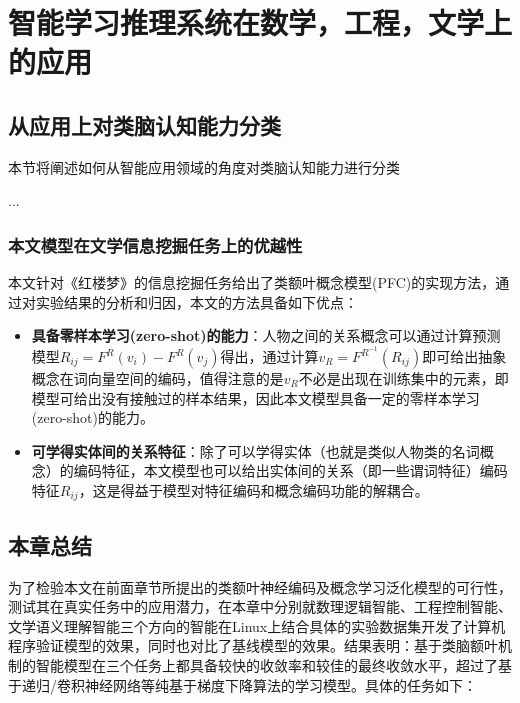 

\chapter{智能学习推理系统在数学，工程，文学上的应用}
\label{cha:china}

\section{从应用上对类脑认知能力分类}
本节将阐述如何从智能应用领域的角度对类脑认知能力进行分类


...



\subsection{本文模型在文学信息挖掘任务上的优越性}
本文针对《红楼梦》的信息挖掘任务给出了类额叶概念模型(PFC)的实现方法，通过对实验结果的分析和归因，本文的方法具备如下优点：

\begin{itemize}

\item \textbf{具备零样本学习(zero-shot)的能力}：人物之间的关系概念可以通过计算预测模型$R_{ij} = F^R(v_i) - F^R(v_j)$得出，通过计算$v_R=F^{R^{-1}}(R_{ij})$即可给出抽象概念在词向量空间的编码，值得注意的是$v_R$不必是出现在训练集中的元素，即模型可给出没有接触过的样本结果，因此本文模型具备一定的零样本学习(zero-shot)的能力。

\item \textbf{可学得实体间的关系特征}：除了可以学得实体（也就是类似人物类的名词概念）的编码特征，本文模型也可以给出实体间的关系（即一些谓词特征）编码特征$R_{ij}$，这是得益于模型对特征编码和概念编码功能的解耦合。

\end{itemize}



\section{本章总结}
为了检验本文在前面章节所提出的类额叶神经编码及概念学习泛化模型的可行性，测试其在真实任务中的应用潜力，在本章中分别就数理逻辑智能、工程控制智能、文学语义理解智能三个方向的智能在Linux上结合具体的实验数据集开发了计算机程序验证模型的效果，同时也对比了基线模型的效果。结果表明：基于类脑额叶机制的智能模型在三个任务上都具备较快的收敛率和较佳的最终收敛水平，超过了基于递归/卷积神经网络等纯基于梯度下降算法的学习模型。具体的任务如下：

